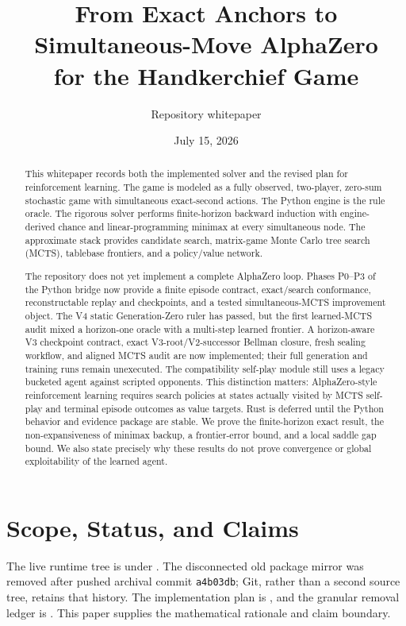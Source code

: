 \documentclass[11pt]{article}
\title{From Exact Anchors to Simultaneous-Move AlphaZero\\
for the \stl{} Handkerchief Game}
\author{Repository whitepaper}
\date{July 15, 2026}
\begin{document}
\maketitle

\begin{abstract}
This whitepaper records both the implemented solver and the revised plan for
reinforcement learning. The game is modeled as a fully observed, two-player,
zero-sum stochastic game with simultaneous exact-second actions. The Python
engine is the rule oracle. The rigorous solver performs finite-horizon
backward induction with engine-derived chance and linear-programming minimax
at every simultaneous node. The approximate stack provides candidate search,
matrix-game Monte Carlo tree search (MCTS), tablebase frontiers, and a
policy/value network.

The repository does not yet implement a complete AlphaZero loop. Phases P0--P3
of the Python bridge now provide a finite episode contract, exact/search
conformance, reconstructable replay and checkpoints, and a tested
simultaneous-MCTS improvement object. The V4 static Generation-Zero ruler has
passed, but the first learned-MCTS audit mixed a horizon-one oracle with a
multi-step learned frontier. A horizon-aware V3 checkpoint contract, exact
V3-root/V2-successor Bellman closure, fresh sealing workflow, and aligned MCTS
audit are now implemented; their full generation and training runs remain
unexecuted. The compatibility self-play module still uses a legacy bucketed agent against
scripted opponents. This distinction matters: AlphaZero-style reinforcement
learning requires search policies at states actually visited by MCTS self-play
and terminal episode outcomes as value targets. Rust is deferred until the
Python behavior and evidence package are stable. We prove the finite-horizon exact result, the
non-expansiveness of minimax backup, a frontier-error bound, and a local saddle
gap bound. We also state precisely why these results do not prove convergence
or global exploitability of the learned agent.
\end{abstract}

\section{Scope, Status, and Claims}

The live runtime tree is under . The disconnected old package mirror
was removed after pushed archival commit \texttt{a4b03db}; Git, rather than a
second source tree, retains that history. The implementation plan is
, and the granular removal ledger is
. This paper supplies the mathematical
rationale and claim boundary.
\end{document}

